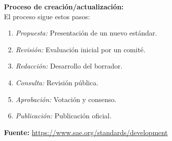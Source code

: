 \documentclass[12pt]{report}
\begin{document}
\textbf{Proceso de creación/actualización:} \\
El proceso sigue estos pasos:
\begin{enumerate}
	\item \textit{Propuesta:} Presentación de un nuevo estándar.
	\item \textit{Revisión:} Evaluación inicial por un comité.
	\item \textit{Redacción:} Desarrollo del borrador.
	\item \textit{Consulta:} Revisión pública.
	\item \textit{Aprobación:} Votación y consenso.
	\item \textit{Publicación:} Publicación oficial.
\end{enumerate}

\textbf{Fuente:} \url{https://www.sae.org/standards/development}

	
\end{document}

